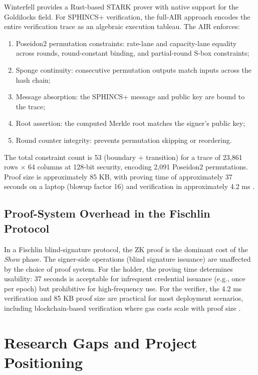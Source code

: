 \documentclass[11pt,a4paper]{article}
\begin{document}
Winterfell provides a Rust-based STARK prover with native support for the Goldilocks field.
For SPHINCS+ verification, the full-AIR approach encodes the entire verification trace as an
algebraic execution tableau.  The AIR enforces:

\begin{enumerate}
  \item Poseidon2 permutation constraints: rate-lane and capacity-lane equality across rounds,
        round-constant binding, and partial-round S-box constraints;
  \item Sponge continuity: consecutive permutation outputs match inputs across the hash chain;
  \item Message absorption: the SPHINCS+ message and public key are bound to the trace;
  \item Root assertion: the computed Merkle root matches the signer's public key;
  \item Round counter integrity: prevents permutation skipping or reordering.
\end{enumerate}

The total constraint count is 53 (boundary + transition) for a trace of 23,861 rows $\times$
64 columns at 128-bit security, encoding 2,091 Poseidon2 permutations.  Proof size is
approximately 85 KB, with proving time of approximately 37 seconds on a laptop (blowup
factor 16) and verification in approximately 4.2 ms \cite{Adomnicai2026}.

\subsection{Proof-System Overhead in the Fischlin Protocol}

In a Fischlin blind-signature protocol, the ZK proof is the dominant cost of the \emph{Show}
phase.  The signer-side operations (blind signature issuance) are unaffected by the choice of
proof system.  For the holder, the proving time determines usability: 37 seconds is acceptable
for infrequent credential issuance (e.g., once per epoch) but prohibitive for high-frequency
use.  For the verifier, the 4.2 ms verification and 85 KB proof size are practical for most
deployment scenarios, including blockchain-based verification where gas costs scale with proof
size \cite{Quan2022}.

\section{Research Gaps and Project Positioning}
\label{sec:gaps}
\end{document}
